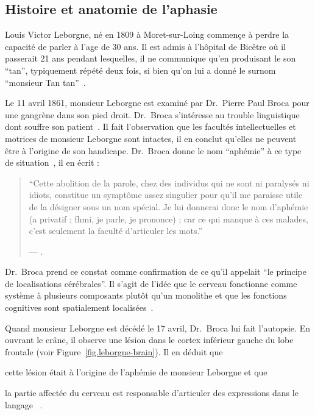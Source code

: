 \subsection{Histoire et anatomie de l'aphasie}

Louis Victor Leborgne, né en 1809 à Moret-sur-Loing commençe à perdre 
la capacité de parler à l'age de 30 ans.
Il est admis à l'hôpital de Bicêtre où il passerait 21 ans pendant lesquelles, 
il ne communique qu'en produisant le son ``tan'', typiquement répété deux fois, 
si bien qu'on lui a donné le surnom ``monsieur Tan tan''~\cite{Mohammed_Narayan_Patra_Nanda_2018}.

Le 11 avril 1861, monsieur Leborgne est examiné par Dr.~Pierre Paul Broca 
pour une gangrène dans son pied droit.
Dr.~Broca s'intéresse au trouble linguistique dont souffre son patient~\cite{Lorch_2011}.
Il fait l'observation que les facultés intellectuelles et motrices de monsieur Leborgne sont intactes,
il en conclut qu'elles ne peuvent être à l'origine de son handicape. 
Dr.~Broca donne le nom ``aphémie'' à ce type de situation~\cite{Broca}, il en écrit :

\begin{quotation}
    ``Cette abolition de la parole, chez des individus qui ne sont ni paralysés ni idiots, constitue un symptôme assez singulier pour qu'il me paraisse utile de la désigner sous un nom spécial. Je lui donnerai donc le nom d'aphémie (\textgreek{a} privatif ; \textgreek{fhmi}, je parle, je prononce) ; car ce qui manque à ces malades, c'est seulement la faculté d'articuler les mots.''
    \begin{flushright}
        \rm --- .
    \end{flushright}
\end{quotation}

Dr.~Broca prend ce constat comme confirmation de ce qu'il appelait 
``le principe de localisations cérébrales''.
Il s'agit de l'idée que le cerveau fonctionne comme système à plusieurs composants plutôt qu'un monolithe
et que les fonctions cognitives sont spatialement localisées~\cite{Fodor_1983}.

Quand monsieur Leborgne est décédé le 17 avril, Dr.~Broca lui fait l'autopsie.
En ouvrant le crâne, il observe une lésion dans le cortex inférieur gauche du lobe frontale 
(voir Figure~\ref{fig.leborgne-brain}).
Il en déduit que 
\begin{enumerate*}[label=(\arabic*)]
    \item cette lésion était à l'origine de l'aphémie de monsieur Leborgne et que 
    \item la partie affectée du cerveau est responsable d'articuler des expressions dans le langage%
    ~\cite{Broca,Lorch_2011,Mohammed_Narayan_Patra_Nanda_2018}.
\end{enumerate*}

